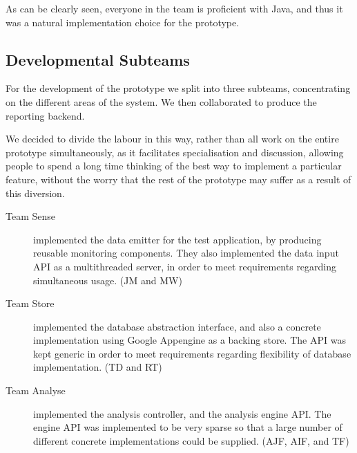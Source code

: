 As can be clearly seen, everyone in the team is proficient with Java, and thus
it was a natural implementation choice for the prototype.

\subsection{Developmental Subteams}
\label{sec:team-subteams}

For the development of the prototype we split into three subteams,
concentrating on the different areas of the system. We then collaborated to
produce the reporting backend.

We decided to divide the labour in this way, rather than all work on the entire
prototype simultaneously, as it facilitates specialisation and discussion,
allowing people to spend a long time thinking of the best way to implement a
particular feature, without the worry that the rest of the prototype may suffer
as a result of this diversion.

\begin{description}
  \item[Team Sense] implemented the data emitter for the test application,
    by producing reusable monitoring components. They also implemented the data
    input API as a multithreaded server, in order to meet requirements
    regarding simultaneous usage. (JM and MW)

  \item[Team Store] implemented the database abstraction interface, and also a
    concrete implementation using Google Appengine as a backing store. The API
    was kept generic in order to meet requirements regarding flexibility of
    database implementation. (TD and RT)

  \item[Team Analyse] implemented the analysis controller, and the analysis
    engine API. The engine API was implemented to be very sparse so that a large
    number of different concrete implementations could be supplied. (AJF, AIF,
    and TF)
\end{description}

